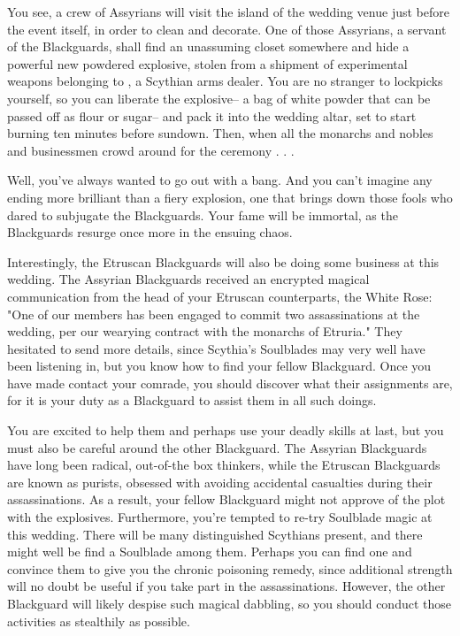 \documentclass[char]{Kos}
\begin{document}
You see, a crew of Assyrians will visit the island of the wedding venue just before the event itself, in order to clean and decorate. One of those Assyrians, a servant of the Blackguards, shall find an unassuming closet somewhere and hide a powerful new powdered explosive, stolen from a shipment of experimental weapons belonging to \cArmsDealer{}, a Scythian arms dealer. You are no stranger to lockpicks yourself, so you can liberate the explosive-- a bag of white powder that can be passed off as flour or sugar-- and pack it into the wedding altar, set to start burning ten minutes before sundown. Then, when all the monarchs and nobles and businessmen crowd around for the ceremony . . .

Well, you've always wanted to go out with a bang. And you can't imagine any ending more brilliant than a fiery explosion, one that brings down those fools who dared to subjugate the Blackguards. Your fame will be immortal, as the Blackguards resurge once more in the ensuing chaos.

Interestingly, the Etruscan Blackguards will also be doing some business at this wedding. The Assyrian Blackguards received an encrypted magical communication from the head of your Etruscan counterparts, the White Rose: "One of our members has been engaged to commit two assassinations at the wedding, per our wearying contract with the monarchs of Etruria." They hesitated to send more details, since Scythia's Soulblades may very well have been listening in, but you know how to find your fellow Blackguard. Once you have made contact your comrade, you should discover what their assignments are, for it is your duty as a Blackguard to assist them in all such doings.

You are excited to help them and perhaps use your deadly skills at last, but you must also be careful around the other Blackguard. The Assyrian Blackguards have long been radical, out-of-the box thinkers, while the Etruscan Blackguards are known as purists, obsessed with avoiding accidental casualties during their assassinations. As a result, your fellow Blackguard might not approve of the plot with the explosives. Furthermore, you're tempted to re-try Soulblade magic at this wedding. There will be many distinguished Scythians present, and there might well be find a Soulblade among them. Perhaps you can find one and convince them to give you the chronic poisoning remedy, since additional strength will no doubt be useful if you take part in the assassinations. However, the other Blackguard will likely despise such magical dabbling, so you should conduct those activities as stealthily as possible.
\end{document}
